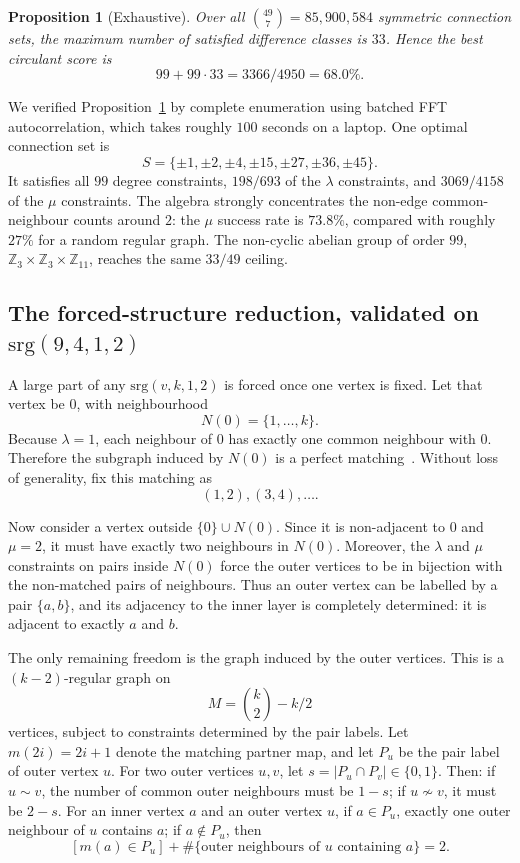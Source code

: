 \documentclass{article}
\newtheorem{proposition}{Proposition}
\begin{document}
\begin{proposition}[Exhaustive]\label{prop:circ}
Over all $\binom{49}{7}=85{,}900{,}584$ symmetric connection sets, the maximum
number of satisfied difference classes is $33$. Hence the best circulant score
is
\[
99+99\cdot33=3366/4950=68.0\%.
\]
\end{proposition}

We verified Proposition~\ref{prop:circ} by complete enumeration using batched
FFT autocorrelation, which takes roughly $100$ seconds on a laptop. One
optimal connection set is
\[
S=\{\pm1,\pm2,\pm4,\pm15,\pm27,\pm36,\pm45\}.
\]
It satisfies all $99$ degree constraints, $198/693$ of the $\lambda$
constraints, and $3069/4158$ of the $\mu$ constraints. The algebra strongly
concentrates the non-edge common-neighbour counts around $2$: the $\mu$
success rate is $73.8\%$, compared with roughly $27\%$ for a random regular
graph. The non-cyclic abelian group of order $99$,
$\mathbb{Z}_3\times\mathbb{Z}_3\times\mathbb{Z}_{11}$, reaches the same
$33/49$ ceiling.

\subsection{The forced-structure reduction, validated on \texorpdfstring{$\mathrm{srg}(9,4,1,2)$}{srg(9,4,1,2)}}
\label{sec:reduction}
A large part of any $\mathrm{srg}(v,k,1,2)$ is forced once one vertex is fixed.
Let that vertex be $0$, with neighbourhood
\[
N(0)=\{1,\dots,k\}.
\]
Because $\lambda=1$, each neighbour of $0$ has exactly one common neighbour
with $0$. Therefore the subgraph induced by $N(0)$ is a perfect
matching~\cite{bcn1989}. Without loss of generality, fix this matching as
\[
(1,2),(3,4),\dots.
\]

Now consider a vertex outside $\{0\}\cup N(0)$. Since it is non-adjacent to
$0$ and $\mu=2$, it must have exactly two neighbours in $N(0)$. Moreover, the
$\lambda$ and $\mu$ constraints on pairs inside $N(0)$ force the outer
vertices to be in bijection with the non-matched pairs of neighbours. Thus an
outer vertex can be labelled by a pair $\{a,b\}$, and its adjacency to the
inner layer is completely determined: it is adjacent to exactly $a$ and $b$.

The only remaining freedom is the graph induced by the outer vertices. This is
a $(k-2)$-regular graph on
\[
M=\binom{k}{2}-k/2
\]
vertices, subject to constraints determined by the pair labels. Let
$m(2i)=2i+1$ denote the matching partner map, and let $P_u$ be the pair
label of outer vertex $u$. For two outer vertices $u,v$, let
$s=|P_u\cap P_v|\in\{0,1\}$. Then:
if $u\sim v$, the number of common outer neighbours must be $1-s$; if
$u\not\sim v$, it must be $2-s$. For an inner vertex $a$ and an outer vertex
$u$, if $a\in P_u$, exactly one outer neighbour of $u$ contains $a$; if
$a\notin P_u$, then
\[
[m(a)\in P_u]
+\#\{\text{outer neighbours of }u\text{ containing }a\}
=2.
\]
\end{document}
